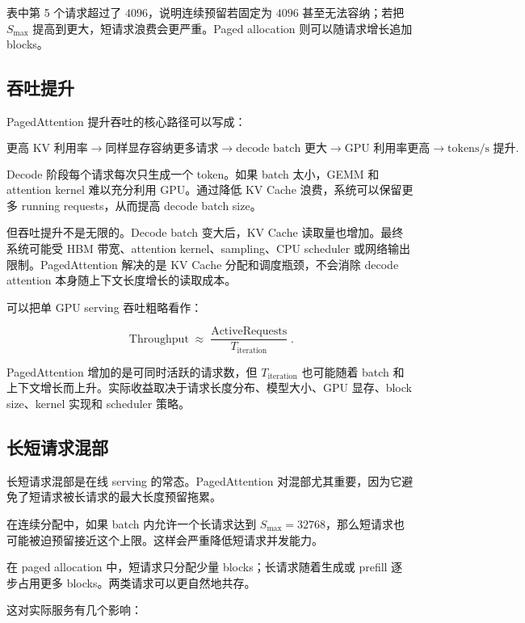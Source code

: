 表中第 5 个请求超过了 $4096$，说明连续预留若固定为 $4096$ 甚至无法容纳；若把 $S_{\max}$ 提高到更大，短请求浪费会更严重。Paged allocation 则可以随请求增长追加 blocks。

\subsection{吞吐提升}
\label{subsec:pagedattention-throughput-improvement}

PagedAttention 提升吞吐的核心路径可以写成：

\[
\text{更高 KV 利用率}
\rightarrow
\text{同样显存容纳更多请求}
\rightarrow
\text{decode batch 更大}
\rightarrow
\text{GPU 利用率更高}
\rightarrow
\text{tokens/s 提升}.
\]

Decode 阶段每个请求每次只生成一个 token。如果 batch 太小，GEMM 和 attention kernel 难以充分利用 GPU。通过降低 KV Cache 浪费，系统可以保留更多 running requests，从而提高 decode batch size。

但吞吐提升不是无限的。Decode batch 变大后，KV Cache 读取量也增加。最终系统可能受 HBM 带宽、attention kernel、sampling、CPU scheduler 或网络输出限制。PagedAttention 解决的是 KV Cache 分配和调度瓶颈，不会消除 decode attention 本身随上下文长度增长的读取成本。

可以把单 GPU serving 吞吐粗略看作：

\[
\operatorname{Throughput}
\approx
\frac{
\operatorname{ActiveRequests}
}
{
T_{\mathrm{iteration}}
}.
\]

PagedAttention 增加的是可同时活跃的请求数，但 $T_{\mathrm{iteration}}$ 也可能随着 batch 和上下文增长而上升。实际收益取决于请求长度分布、模型大小、GPU 显存、block size、kernel 实现和 scheduler 策略。

\subsection{长短请求混部}
\label{subsec:mixed-long-short-requests}

长短请求混部是在线 serving 的常态。PagedAttention 对混部尤其重要，因为它避免了短请求被长请求的最大长度预留拖累。

在连续分配中，如果 batch 内允许一个长请求达到 $S_{\max}=32768$，那么短请求也可能被迫预留接近这个上限。这样会严重降低短请求并发能力。

在 paged allocation 中，短请求只分配少量 blocks；长请求随着生成或 prefill 逐步占用更多 blocks。两类请求可以更自然地共存。

这对实际服务有几个影响：


